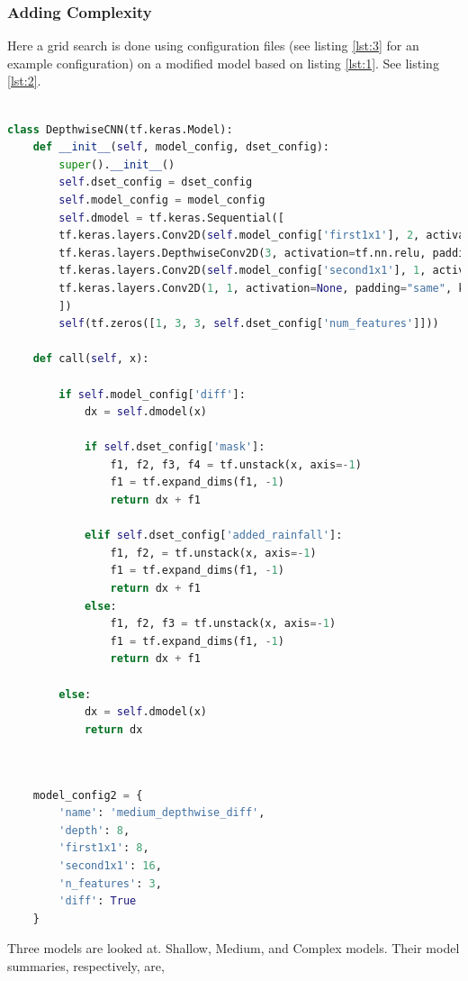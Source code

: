 \subsubsection*{Adding Complexity}
Here a grid search is done using configuration files (see listing \ref{lst:3} for an example configuration) on a modified model based on listing \ref{lst:1}. See listing \ref{lst:2}.
\begin{lstlisting}[language=Python,  label={lst:2}]

class DepthwiseCNN(tf.keras.Model):
	def __init__(self, model_config, dset_config):
		super().__init__()
		self.dset_config = dset_config
		self.model_config = model_config
		self.dmodel = tf.keras.Sequential([
		tf.keras.layers.Conv2D(self.model_config['first1x1'], 2, activation=tf.nn.relu, padding="same"),
		tf.keras.layers.DepthwiseConv2D(3, activation=tf.nn.relu, padding="same", depth_multiplier=self.model_config['depth']),
		tf.keras.layers.Conv2D(self.model_config['second1x1'], 1, activation=tf.nn.relu, padding="same"),
		tf.keras.layers.Conv2D(1, 1, activation=None, padding="same", kernel_initializer=tf.zeros_initializer)
		])
		self(tf.zeros([1, 3, 3, self.dset_config['num_features']]))

	def call(self, x):
	
		if self.model_config['diff']:
			dx = self.dmodel(x)
			
			if self.dset_config['mask']:
				f1, f2, f3, f4 = tf.unstack(x, axis=-1)
				f1 = tf.expand_dims(f1, -1)
				return dx + f1
		
			elif self.dset_config['added_rainfall']:
				f1, f2, = tf.unstack(x, axis=-1)
				f1 = tf.expand_dims(f1, -1)
				return dx + f1
			else:
				f1, f2, f3 = tf.unstack(x, axis=-1)
				f1 = tf.expand_dims(f1, -1)
				return dx + f1
		
		else:
			dx = self.dmodel(x)
			return dx
	
\end{lstlisting}

\begin{lstlisting}[language=Python, label={lst:3}]

	model_config2 = {
		'name': 'medium_depthwise_diff',
		'depth': 8,
		'first1x1': 8,
		'second1x1': 16,
		'n_features': 3,
		'diff': True
	}

\end{lstlisting}

Three models are looked at. Shallow, Medium, and Complex models. Their model summaries, respectively, are,


